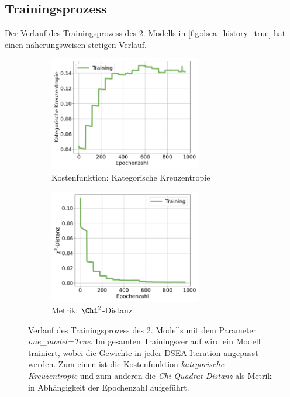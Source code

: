 \subsection{Trainingsprozess} \label{sec:dsea_training}
Der Verlauf des Trainingsprozess des 2. Modells in \autoref{fig:dsea_history_true} hat einen näherungsweisen stetigen Verlauf.
\begin{figure}%
    \begin{subfigure}{0.5\textwidth}%
        \centering%
        \includegraphics[height=5cm]{Plots/DSEA/True/loss.pdf}%
        \caption{Kostenfunktion: Kategorische Kreuzentropie}%
    \end{subfigure}%
    \hfill%
    \begin{subfigure}{0.5\textwidth}%
        \centering%
        \includegraphics[height=5cm]{Plots/DSEA/True/chi.pdf}%
        \caption{Metrik: $\Chi^2$-Distanz}%
    \end{subfigure}%
    \caption[Verlauf des Trainingsprozess des 2. Modells in DSEA]{Verlauf des Trainingsprozess des 2. Modells mit dem Parameter \textit{one\_model=True}.
    Im gesamten Trainingsverlauf wird ein Modell trainiert, wobei die Gewichte in jeder DSEA-Iteration angepasst werden.
    Zum einen ist die Kostenfunktion \textit{kategorische Kreuzentropie} und zum anderen die \textit{Chi-Quadrat-Distanz} als Metrik in Abhängigkeit der Epochenzahl aufgeführt.
    }
    \label{fig:dsea_history_true}%
\end{figure}%
